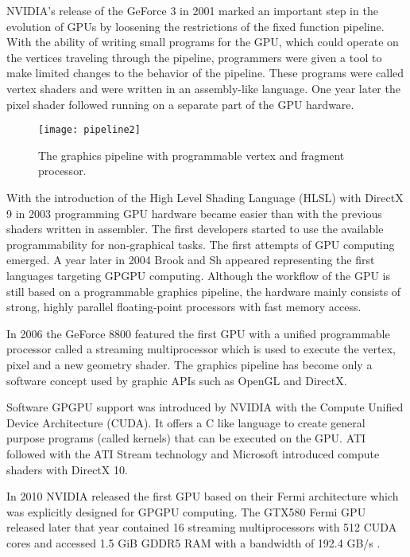 NVIDIA's release of the GeForce 3 in 2001 marked an important step in the evolution of GPUs by loosening the restrictions of the fixed function pipeline. With the ability of writing small programs for the GPU, which could operate on the vertices traveling through the pipeline, programmers were given a tool to make limited changes to the behavior of the pipeline. These programs were called vertex shaders and were written in an assembly-like language. One year later the pixel shader followed running on a separate part of the GPU hardware.

\begin{figure} %
\centering
\texttt{[image: pipeline2]}
\caption{The graphics pipeline with programmable vertex and fragment processor. \cite{cg_book}}
\label{fig:pipeline2}
\end{figure}

With the introduction of the High Level Shading Language (HLSL) with DirectX 9 in 2003 programming GPU hardware became easier than with the previous shaders written in assembler. The first developers started to use the available programmability for non-graphical tasks. The first attempts of GPU computing emerged. A year later in 2004 Brook and Sh appeared representing the first languages targeting GPGPU computing.
Although the workflow of the GPU is still based on a programmable graphics pipeline, the hardware mainly consists of strong, highly parallel floating-point processors with fast memory access.

In 2006 the GeForce 8800 featured the first GPU with a unified programmable processor called a streaming multiprocessor which is used to execute the vertex, pixel and a new geometry shader. The graphics pipeline has become only a software concept used by graphic APIs such as OpenGL and DirectX.

Software GPGPU support was introduced by NVIDIA with the Compute Unified Device Architecture (CUDA). It offers a C like language to create general purpose programs (called kernels) that can be executed on the GPU. ATI followed with the ATI Stream technology and Microsoft introduced compute shaders with DirectX 10.

In 2010 NVIDIA released the first GPU based on their Fermi architecture which was explicitly designed for GPGPU computing. The GTX580 Fermi GPU released later that year contained 16 streaming multiprocessors with 512 CUDA cores and accessed 1.5 GiB GDDR5 RAM with a bandwidth of 192.4 GB/s \cite{gtx580_spec}.


